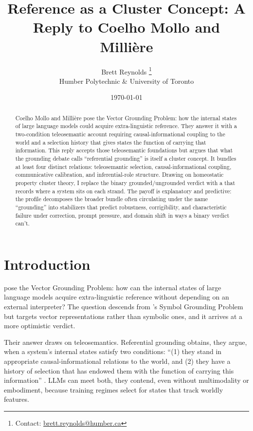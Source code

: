 \documentclass[12pt]{article}
\title{Reference as a Cluster Concept: A Reply to Coelho Mollo and Milli\`ere}
\author{Brett Reynolds \orcidlink{0000-0003-0073-7195}%
\thanks{Contact: \href{mailto:brett.reynolds@humber.ca}{brett.reynolds@humber.ca}}\\
Humber Polytechnic \& University of Toronto}
\date{\today}
\begin{document}
\maketitle

\begin{abstract}
Coelho Mollo and Milli\`ere pose the Vector Grounding Problem: how the internal states of large language models could acquire extra-linguistic reference. They answer it with a two-condition teleosemantic account requiring causal-informational coupling to the world and a selection history that gives states the function of carrying that information. This reply accepts those teleosemantic foundations but argues that what the grounding debate calls \enquote{referential grounding} is itself a cluster concept. It bundles at least four distinct relations: teleosemantic selection, causal-informational coupling, communicative calibration, and inferential-role structure. Drawing on homeostatic property cluster theory, I replace the binary grounded/ungrounded verdict with a  that records where a system sits on each strand. The payoff is explanatory and predictive: the profile decomposes the broader bundle often circulating under the name \enquote{grounding} into stabilizers that predict robustness, corrigibility, and characteristic failure under correction, prompt pressure, and domain shift in ways a binary verdict can't.
\end{abstract}

\section{Introduction}
\label{sec:intro}

\textcite{coelho_mollo_milliere_2026_vector_grounding_problem} pose the Vector Grounding Problem: how can the internal states of large language models acquire extra-linguistic reference without depending on an external interpreter? The question descends from \textcite{harnad_1990_symbol_grounding_problem}'s Symbol Grounding Problem but targets vector representations rather than symbolic ones, and it arrives at a more optimistic verdict.

Their answer draws on teleosemantics. Referential grounding obtains, they argue, when a system's internal states satisfy two conditions: \enquote{(1) they stand in appropriate causal-informational relations to the world, and (2) they have a history of selection that has endowed them with the function of carrying this information} \citep[1]{coelho_mollo_milliere_2026_vector_grounding_problem}. LLMs can meet both, they contend, even without multimodality or embodiment, because training regimes select for states that track worldly features.
\end{document}

